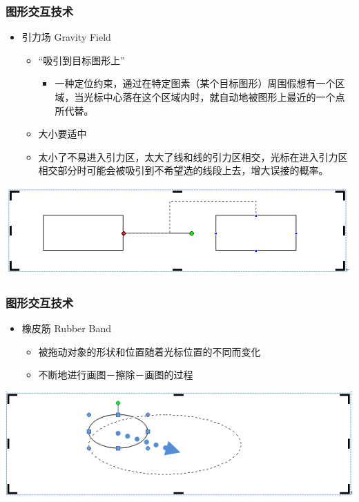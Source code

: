 \documentclass{beamer}
\begin{document}
\begin{frame}
	\frametitle{图形交互技术}
	\begin{itemize}
		\item 引力场 Gravity Field
		\begin{itemize}
			\item “吸引到目标图形上”
			\begin{itemize}
				\item 一种定位约束，通过在特定图素（某个目标图形）周围假想有一个区域，当光标中心落在这个区域内时，就自动地被图形上最近的一个点所代替。
			\end{itemize}
			\item 大小要适中
			\item 太小了不易进入引力区，太大了线和线的引力区相交，光标在进入引力区相交部分时可能会被吸引到不希望选的线段上去，增大误接的概率。
		\end{itemize}
	\end{itemize}
	\begin{center}
	\includegraphics[width=.9\textwidth]{images/gravity-field.png}
	\end{center}
\end{frame}

\begin{frame}
	\frametitle{图形交互技术}
	\begin{itemize}
		\item 橡皮筋 Rubber Band
		\begin{itemize}
			\item 被拖动对象的形状和位置随着光标位置的不同而变化
			\item 不断地进行画图－擦除－画图的过程
		\end{itemize}
	\end{itemize}
	\begin{center}
	\includegraphics[width=.9\textwidth]{images/rubber-band.png}
	\end{center}
\end{frame}
\end{document}
